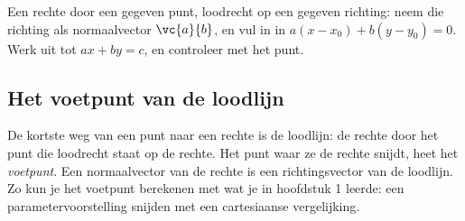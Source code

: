 
\begin{werkwijze}
Een rechte door een gegeven punt, loodrecht op een gegeven richting: neem die richting als normaalvector $\vc{a}{b}$, en vul in in $a(x - x_0) + b(y - y_0) = 0$. Werk uit tot $ax + by = c$, en controleer met het punt.
\end{werkwijze}

\begin{oefeningen}
\end{oefeningen}

\subsection{Het voetpunt van de loodlijn}

De kortste weg van een punt naar een rechte is de loodlijn: de rechte door het punt die loodrecht staat op de rechte. Het punt waar ze de rechte snijdt, heet het \textit{voetpunt}. Een normaalvector van de rechte is een richtingsvector van de loodlijn. Zo kun je het voetpunt berekenen met wat je in hoofdstuk 1 leerde: een parametervoorstelling snijden met een cartesiaanse vergelijking.

